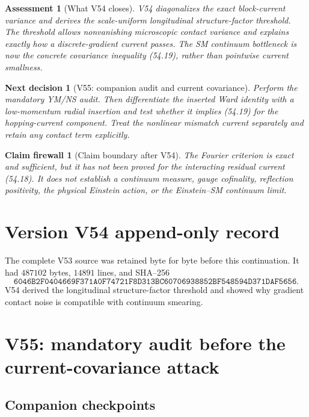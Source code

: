 \documentclass[11pt]{article}
\newtheorem{firewall}[theorem]{Claim firewall}
\newtheorem{decision}[theorem]{Next decision}
\newtheorem{assessment}[theorem]{Assessment}
\theoremstyle{remark}
\begin{document}
\begin{assessment}[What V54 closes]
\label{ass:v17v54-status}
V54 diagonalizes the exact block-current variance and derives the
scale-uniform longitudinal structure-factor threshold.  The threshold
allows nonvanishing microscopic contact variance and explains exactly
how a discrete-gradient current passes.  The SM continuum bottleneck
is now the concrete covariance inequality (54.19), rather than
pointwise current smallness.
\end{assessment}

\begin{decision}[V55: companion audit and current covariance]
\label{dec:v17v54-next}
Perform the mandatory YM/NS audit.  Then differentiate the inserted
Ward identity with a low-momentum radial insertion and test whether it
implies (54.19) for the hopping-current component.  Treat the nonlinear
mismatch current separately and retain any contact term explicitly.
\end{decision}

\begin{firewall}[Claim boundary after V54]
\label{fire:v17v54}
The Fourier criterion is exact and sufficient, but it has not been
proved for the interacting residual current (54.18).  It does not
establish a continuum measure, gauge cofinality, reflection positivity,
the physical Einstein action, or the Einstein--SM continuum limit.
\end{firewall}

\section*{Version V54 append-only record}
The complete V53 source was retained byte for byte before this
continuation.  It had \(487102\) bytes, \(14891\) lines, and SHA--256
\[
 \texttt{6046B2F0404669F371A0F74721F8D313BC60706938852BF548594D371DAF5656}.
\]
V54 derived the longitudinal structure-factor threshold and showed
why gradient contact noise is compatible with continuum smearing.


\section{V55: mandatory audit before the current-covariance attack}
\label{sec:v17v55}

\subsection{Companion checkpoints}
\end{document}
